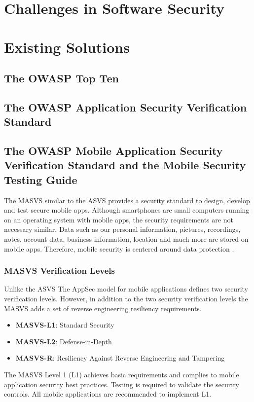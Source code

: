 
\section{Challenges in Software Security}

\section{Existing Solutions}

\subsection{The OWASP Top Ten}

\subsection{The OWASP Application Security Verification Standard}

\subsection{The OWASP Mobile Application Security Verification Standard and the Mobile Security Testing Guide}
The MASVS similar to the ASVS provides a security standard to design, develop and test secure mobile apps. Although smartphones are small computers running on an operating system with mobile apps, the security requirements are not necessary similar. Data such as our personal information, pictures, recordings, notes, account data, business information, location and much more are stored on mobile apps. Therefore, mobile security is centered around data protection \cite{owasp_masvs}.
\subsubsection{MASVS Verification Levels}
Unlike the ASVS The AppSec model for mobile applications defines two security verification levels. However, in addition to the two security verification levels the MASVS adds a set of reverse engineering resiliency requirements.

\begin{itemize}
    \item \textbf{MASVS-L1}: Standard Security
    \item \textbf{MASVS-L2}: Defense-in-Depth
    \item \textbf{MASVS-R}: Resiliency Against Reverse Engineering and Tampering
\end{itemize}
The MASVS Level 1 (L1) achieves basic requirements and complies to mobile application security best practices. Testing is required to validate the security controls. All mobile applications are recommended to implement L1.

